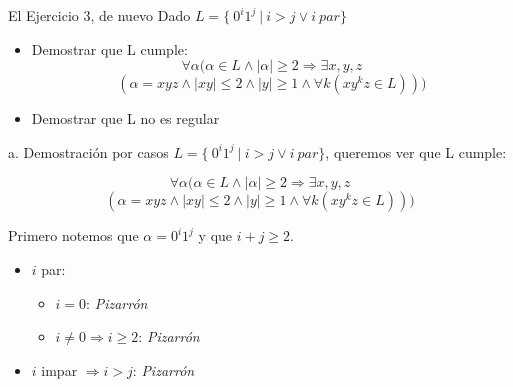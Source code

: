 \documentclass[presentation
]{beamer}
\begin{document}
\begin{frame}{El Ejercicio 3, de nuevo}
Dado $L = \{~0^i1^j ~| ~i>j \lor i~ par\}$

\begin{itemize}
\item[a] Demostrar que L cumple: 
$$ \forall \alpha (\alpha \in L \land |\alpha| \geq 2 \Rightarrow \exists x, y, z $$ 
$$  (\alpha = xyz \land |xy| \leq 2 \land |y| \geq 1 \land \forall k (xy^kz \in L))) $$

\item[b] Demostrar que L no es regular
\end{itemize}

\end{frame}

\begin{frame}{a. Demostración por casos}
$L = \{~0^i1^j ~| ~i>j \lor i~ par\}$, queremos ver que L cumple:

$$ \forall \alpha (\alpha \in L \land |\alpha| \geq 2 \Rightarrow \exists x, y, z $$ 
$$  (\alpha = xyz \land |xy| \leq 2 \land |y| \geq 1 \land \forall k (xy^kz \in L))) $$


Primero notemos que $\alpha = 0^i1^j$ y que $i+j \geq 2$.

\pause

\begin{itemize}
\item $i$ par:
\pause
\begin{itemize}
\item $i = 0$: \emph{Pizarrón}
\pause
\item $i \neq 0 \Rightarrow i\geq 2$: \emph{Pizarrón}
\end{itemize}
\pause
\item $i$ impar $\Rightarrow i >j$: \emph{Pizarrón}
\end{itemize}
\end{frame}
\end{document}
